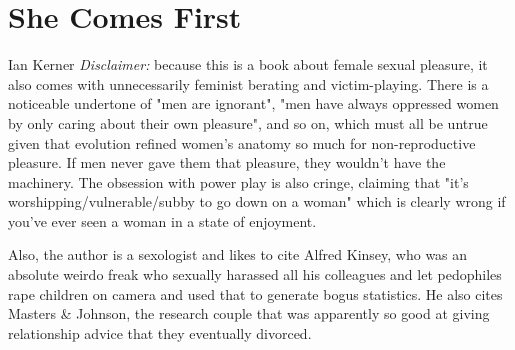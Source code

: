 \chapter{She Comes First}{Ian Kerner}
\emph{Disclaimer:} because this is a book about female sexual pleasure, it also comes with unnecessarily feminist berating and victim-playing. There is a noticeable undertone of "men are ignorant", "men have always oppressed women by only caring about their own pleasure", and so on, which must all be untrue given that evolution refined women's anatomy so much for non-reproductive pleasure. If men never gave them that pleasure, they wouldn't have the machinery. The obsession with power play is also cringe,  claiming that "it's worshipping/vulnerable/subby to go down on a woman" which is clearly wrong if you've ever seen a woman in a state of enjoyment.

Also, the author is a sexologist and likes to cite Alfred Kinsey, who was an absolute weirdo freak who sexually harassed all his colleagues and let pedophiles rape children on camera and used that to generate bogus statistics. He also cites Masters \& Johnson, the research couple that was apparently so good at giving relationship advice that they eventually divorced.

